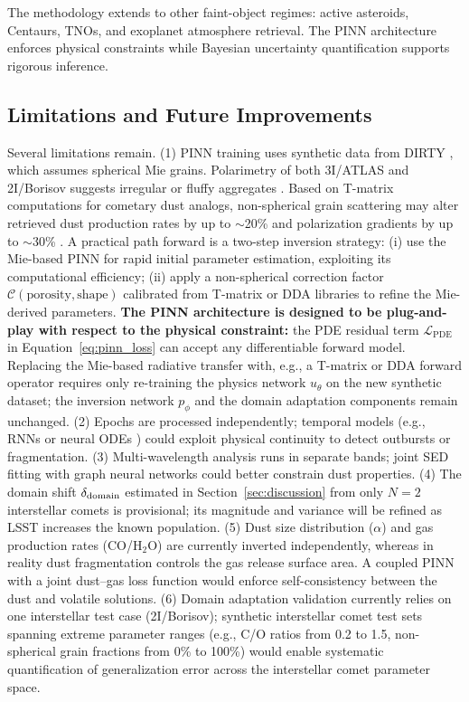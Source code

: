 \documentclass[preprint2]{aastex631}
\begin{document}
The methodology extends to other faint-object regimes: active asteroids, Centaurs, TNOs, and exoplanet atmosphere retrieval. The PINN architecture enforces physical constraints while Bayesian uncertainty quantification supports rigorous inference.

\subsection{Limitations and Future Improvements}

Several limitations remain. (1) PINN training uses synthetic data from DIRTY \citep{gordon01}, which assumes spherical Mie grains. Polarimetry of both 3I/ATLAS and 2I/Borisov suggests irregular or fluffy aggregates \citep{kolokolova04}. Based on T-matrix computations for cometary dust analogs, non-spherical grain scattering may alter retrieved dust production rates by up to $\sim$20\% and polarization gradients by up to $\sim$30\% \citep{kolokolova04,shen11}. A practical path forward is a two-step inversion strategy: (i) use the Mie-based PINN for rapid initial parameter estimation, exploiting its computational efficiency; (ii) apply a non-spherical correction factor $\mathcal{C}(\text{porosity}, \text{shape})$ calibrated from T-matrix or DDA libraries to refine the Mie-derived parameters. \textbf{The PINN architecture is designed to be plug-and-play with respect to the physical constraint:} the PDE residual term $\mathcal{L}_{\text{PDE}}$ in Equation~\ref{eq:pinn_loss} can accept any differentiable forward model. Replacing the Mie-based radiative transfer with, e.g., a T-matrix or DDA forward operator requires only re-training the physics network $u_\theta$ on the new synthetic dataset; the inversion network $p_\phi$ and the domain adaptation components remain unchanged. (2) Epochs are processed independently; temporal models (e.g., RNNs or neural ODEs \citep{chen18}) could exploit physical continuity to detect outbursts or fragmentation. (3) Multi-wavelength analysis runs in separate bands; joint SED fitting with graph neural networks could better constrain dust properties. (4) The domain shift $\delta_{\rm domain}$ estimated in Section~\ref{sec:discussion} from only $N=2$ interstellar comets is provisional; its magnitude and variance will be refined as LSST increases the known population. (5) Dust size distribution ($\alpha$) and gas production rates (CO/H$_2$O) are currently inverted independently, whereas in reality dust fragmentation controls the gas release surface area. A coupled PINN with a joint dust--gas loss function would enforce self-consistency between the dust and volatile solutions. (6) Domain adaptation validation currently relies on one interstellar test case (2I/Borisov); synthetic interstellar comet test sets spanning extreme parameter ranges (e.g., C/O ratios from 0.2 to 1.5, non-spherical grain fractions from 0\% to 100\%) would enable systematic quantification of generalization error across the interstellar comet parameter space.
\end{document}
